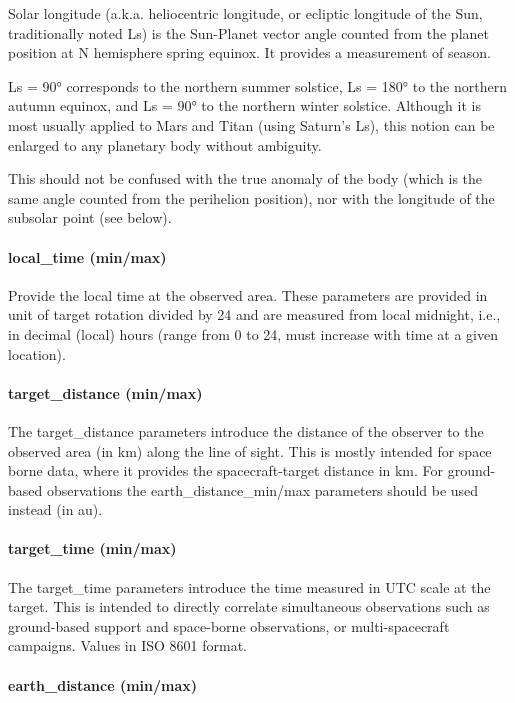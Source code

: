 \documentclass[11pt,a4paper]{ivoa}
\begin{document}
Solar longitude (a.k.a. heliocentric longitude, or ecliptic longitude of
the Sun, traditionally noted Ls) is the Sun-Planet vector angle counted
from the planet position at N hemisphere spring equinox. It provides a
measurement of season.

Ls = 90° corresponds to the northern summer solstice, Ls = 180°
to the northern autumn equinox, and Ls = 90° to the northern winter
solstice. Although it is most usually applied to Mars and Titan (using
Saturn's Ls), this notion can be enlarged to any planetary body without
ambiguity.

This should not be confused with the true anomaly of the body (which
is the same angle counted from the perihelion position), nor with the
longitude of the subsolar point (see below).

\paragraph{local\_time (min/max)}

Provide the local time at the observed area. These parameters are
provided in unit of target rotation divided by 24 and are measured from
local midnight, i.e., in decimal (local) hours (range from 0 to 24,
must increase with time at a given location).

\paragraph{target\_distance (min/max)}

The target\_distance parameters introduce the distance of the observer
to the observed area (in km) along the line of sight. This is mostly
intended for space borne data, where it provides the spacecraft-target
distance in km. For ground-based observations the earth\_distance\_min/max
parameters should be used instead (in au).

\paragraph{target\_time (min/max)}

The target\_time parameters introduce the time measured in UTC scale
at the target. This is intended to directly correlate simultaneous
observations such as ground-based support and space-borne observations,
or multi-spacecraft campaigns. Values in ISO 8601 format.

\paragraph{earth\_distance (min/max)}
\end{document}
